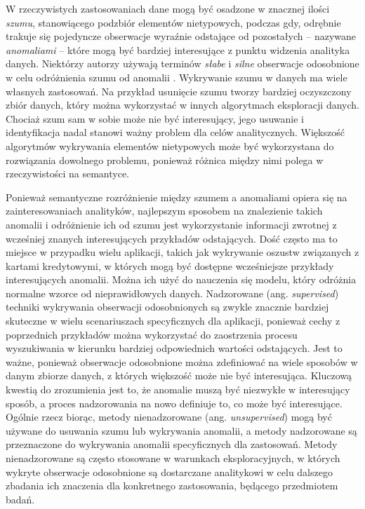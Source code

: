 \documentclass[12pt,a4paper,oneside]{book}
\theoremstyle{definition}
\begin{document}
W rzeczywistych zastosowaniach dane mogą być osadzone w znacznej ilości \textit{szumu}, stanowiącego podzbiór elementów nietypowych, podczas gdy, odrębnie trakuje się pojedyncze obserwacje wyraźnie odstające od pozostałych -- nazywane \textit{anomaliami} -- które mogą być bardziej interesujące z punktu widzenia analityka danych. Niektórzy autorzy używają terminów \textit{słabe} i \textit{silne} obserwacje odosobnione w celu odróżnienia szumu od anomalii \cite{Aggarwal_2001, Knorr_1999}. Wykrywanie szumu w danych ma wiele własnych zastosowań. Na przykład usunięcie szumu tworzy bardziej oczyszczony zbiór danych, który można wykorzystać w innych algorytmach eksploracji danych. Chociaż szum sam w sobie może nie być interesujący, jego usuwanie i identyfikacja nadal stanowi ważny problem dla celów analitycznych. Większość algorytmów wykrywania elementów nietypowych może być wykorzystana do rozwiązania dowolnego problemu, ponieważ różnica między nimi polega w rzeczywistości na semantyce.

Ponieważ semantyczne rozróżnienie między szumem a anomaliami opiera się na zainteresowaniach analityków, najlepszym sposobem na znalezienie takich anomalii i odróżnienie ich od szumu jest wykorzystanie informacji zwrotnej z wcześniej znanych interesujących przykładów odstających. Dość często ma to miejsce w przypadku wielu aplikacji, takich jak wykrywanie oszustw związanych z kartami kredytowymi, w których mogą być dostępne wcześniejsze przykłady interesujących anomalii. Można ich użyć do nauczenia się modelu, który odróżnia normalne wzorce od nieprawidłowych danych. Nadzorowane (ang. \textit{supervised}) techniki wykrywania obserwacji odosobnionych są zwykle znacznie bardziej skuteczne w wielu scenariuszach specyficznych dla aplikacji, ponieważ cechy z poprzednich przykładów można wykorzystać do zaostrzenia procesu wyszukiwania w kierunku bardziej odpowiednich wartości odstających. Jest to ważne, ponieważ obserwacje odosobnione można zdefiniować na wiele sposobów w danym zbiorze danych, z których większość może nie być interesująca. Kluczową kwestią do zrozumienia jest to, że anomalie muszą być niezwykłe w interesujący sposób, a proces nadzorowania na nowo definiuje to, co może być interesujące. Ogólnie rzecz biorąc, metody nienadzorowane (ang. \textit{unsupervised}) mogą być używane do usuwania szumu lub wykrywania anomalii, a metody nadzorowane są przeznaczone do wykrywania anomalii specyficznych dla zastosowań. Metody nienadzorowane są często stosowane w warunkach eksploracyjnych, w których wykryte obserwacje odosobnione są dostarczane analitykowi w celu dalszego zbadania ich znaczenia dla konkretnego zastosowania, będącego przedmiotem badań.
\end{document}
